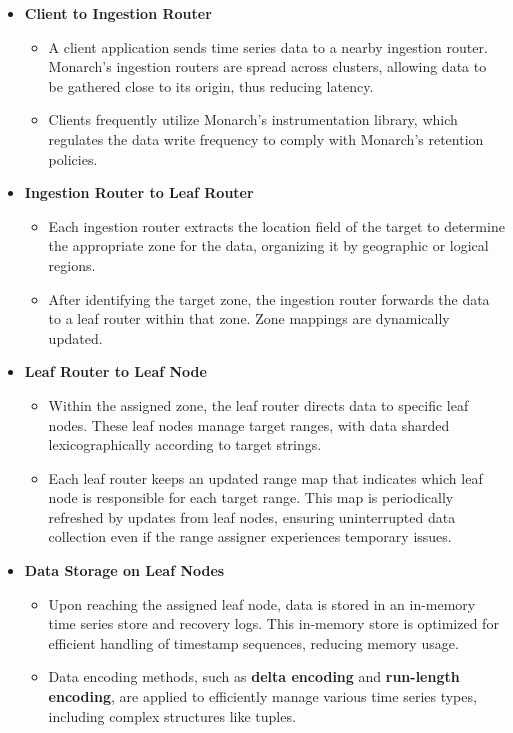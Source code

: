 \begin{itemize}
    \item \textbf{Client to Ingestion Router}
    \begin{itemize}
        \item A client application sends time series data to a nearby ingestion router. Monarch's ingestion routers are spread across clusters, allowing data to be gathered close to its origin, thus reducing latency.
        \item Clients frequently utilize Monarch's instrumentation library, which regulates the data write frequency to comply with Monarch's retention policies.
    \end{itemize}
    
    \item \textbf{Ingestion Router to Leaf Router}
    \begin{itemize}
        \item Each ingestion router extracts the location field of the target to determine the appropriate zone for the data, organizing it by geographic or logical regions.
        \item After identifying the target zone, the ingestion router forwards the data to a leaf router within that zone. Zone mappings are dynamically updated.
    \end{itemize}

    \item \textbf{Leaf Router to Leaf Node}
    \begin{itemize}
        \item Within the assigned zone, the leaf router directs data to specific leaf nodes. These leaf nodes manage target ranges, with data sharded lexicographically according to target strings.
        \item Each leaf router keeps an updated range map that indicates which leaf node is responsible for each target range. This map is periodically refreshed by updates from leaf nodes, ensuring uninterrupted data collection even if the range assigner experiences temporary issues.
    \end{itemize}
    
    \item \textbf{Data Storage on Leaf Nodes}
    \begin{itemize}
        \item Upon reaching the assigned leaf node, data is stored in an in-memory time series store and recovery logs. This in-memory store is optimized for efficient handling of timestamp sequences, reducing memory usage.
        \item Data encoding methods, such as \textbf{delta encoding} and \textbf{run-length encoding}, are applied to efficiently manage various time series types, including complex structures like tuples.
    \end{itemize}
\end{itemize}
